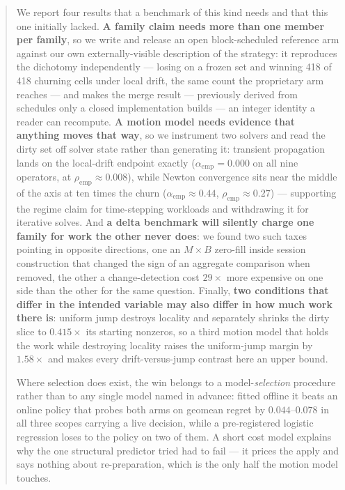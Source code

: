 \documentclass{article}
\begin{document}
\begin{abstract}
We report four results that a benchmark of this kind needs and that this one
initially lacked. \textbf{A family claim needs more than one member per family},
so we write and release an open block-scheduled reference arm against our own
externally-visible description of the strategy: it reproduces the dichotomy
independently --- losing on a frozen set and winning 418 of 418 churning cells
under local drift, the same count the proprietary arm reaches --- and makes the
merge result --- previously
derived from schedules only a closed implementation builds --- an integer
identity a reader can recompute. \textbf{A motion model needs evidence that
anything moves that way}, so we instrument two solvers and read the dirty set off
solver state rather than generating it: transient propagation lands on the
local-drift endpoint exactly ($\alpha_{\text{emp}} = 0.000$ on all nine
operators, at $\rho_{\text{emp}} \approx 0.008$), while Newton convergence sits
near the middle of the axis at ten times the churn ($\alpha_{\text{emp}} \approx
0.44$, $\rho_{\text{emp}} \approx 0.27$) --- supporting the regime claim for
time-stepping workloads and withdrawing it for iterative solves.
And \textbf{a delta benchmark will silently charge one family for work the other
never does}: we found two such taxes pointing in opposite directions, one an
$M{\times}B$ zero-fill inside session construction that changed the sign of an
aggregate comparison when removed, the other a change-detection cost $29\times$
more expensive on one side than the other for the same question.
Finally, \textbf{two conditions that differ in the intended variable may also
differ in how much work there is}: uniform jump destroys locality and separately
shrinks the dirty slice to $0.415\times$ its starting nonzeros, so a third motion
model that holds the work while destroying locality raises the uniform-jump
margin by $1.58\times$ and makes every drift-versus-jump contrast here an upper
bound.

Where selection does exist, the win belongs to a model-\emph{selection}
procedure rather than to any single model named in advance: fitted offline it
beats an online policy that probes both arms on geomean regret by $0.044$--$0.078$
in all three scopes carrying a live decision, while a pre-registered logistic
regression loses to the policy on two of them. A short cost model explains why
the one structural predictor tried had to fail --- it prices the apply and says
nothing about re-preparation, which is the only half the motion model touches.
\end{abstract}
\end{document}
